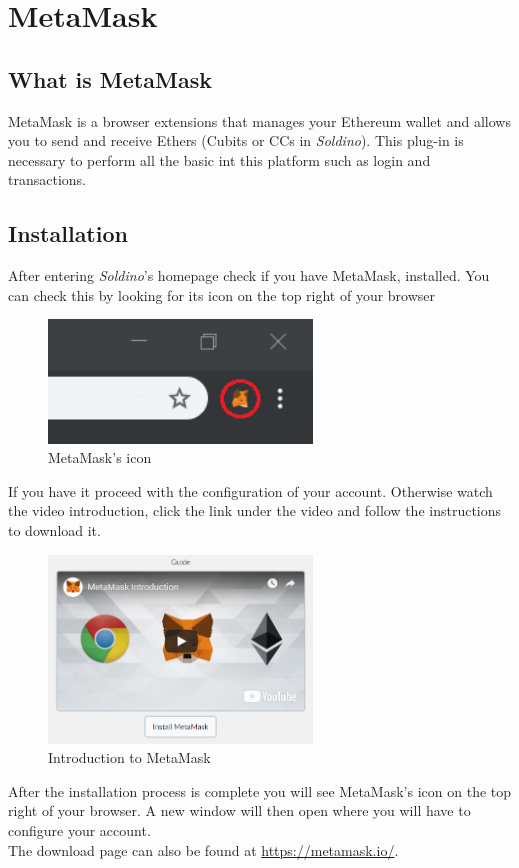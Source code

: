 \section{MetaMask}
	\subsection{What is MetaMask}
	MetaMask is a browser extensions that manages your Ethereum wallet and 
	allows you to send and receive Ethers (Cubits or CCs in \textit{Soldino}). 
	This plug-in is necessary to perform all the basic int this platform
	such as login and transactions. 
	\subsection{Installation}
	After entering \textit{Soldino}'s homepage check if you have MetaMask, 
	installed. You can check this by looking for its icon on the top right of 
	your browser
	\begin{figure}[H]
		\includegraphics[width=7cm]{res/images/metamask_icon.png}
		\centering
		\caption{MetaMask's icon}
	\end{figure}
	\noindent If you have it proceed with the configuration of your account.
	Otherwise watch the video introduction, click the link under the video and 
	follow the instructions to download it. 
	\begin{figure}[H]
		\includegraphics[width=7cm]{res/images/metamask_download.png}
		\centering
		\caption{Introduction to MetaMask}
	\end{figure}
	\noindent After the installation process is 
	complete you will see MetaMask's icon on the top right of your browser. A 
	new window will then open where you will have to configure your account.\\
	The download page can also be found at \url{https://metamask.io/}.
	
